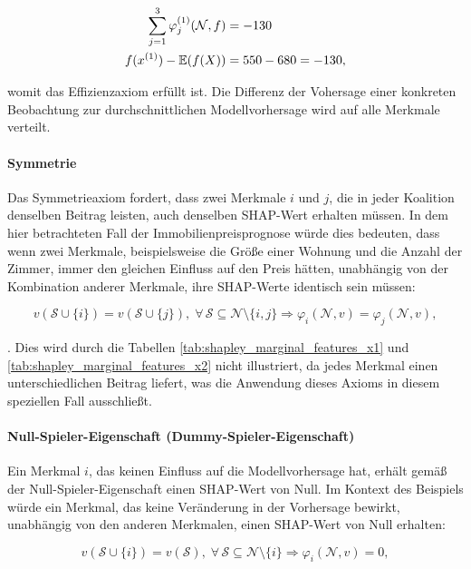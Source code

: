 \begin{align}
    \sum_{j=1}^{3}\varphi_j^{(1)}(\mathcal{N}, f) &=  -130 \\ \notag
    f(x^{(1)}) - \mathbb{E}(f(X)) &= 550 - 680 = -130,   
\end{align}

womit das Effizienzaxiom erfüllt ist. Die Differenz der Vohersage 
einer konkreten Beobachtung zur durchschnittlichen 
Modellvorhersage wird auf alle Merkmale verteilt.

\paragraph{Symmetrie}

Das Symmetrieaxiom fordert, dass zwei Merkmale $i$ und $j$, die 
in jeder Koalition denselben Beitrag leisten, auch denselben SHAP-Wert 
erhalten müssen. In dem hier betrachteten Fall der Immobilienpreisprognose 
würde dies bedeuten, dass wenn zwei Merkmale, beispielsweise die Größe einer 
Wohnung und die Anzahl der Zimmer, immer den gleichen Einfluss auf den Preis hätten, 
unabhängig von der Kombination anderer Merkmale, ihre SHAP-Werte identisch 
sein müssen:

\begin{equation}
    v(\mathcal{S} \cup \{i\}) = v(\mathcal{S} \cup \{j\}), \; \forall\, \mathcal{S} \subseteq \mathcal{N} \setminus \{i, j\} \Rightarrow \varphi_i (\mathcal{N}, v) = \varphi_j (\mathcal{N}, v),
\end{equation}

\cite[S. 221]{Molnar_2022}. Dies wird durch die Tabellen \ref{tab:shapley_marginal_features_x1} und \ref{tab:shapley_marginal_features_x2} 
nicht illustriert, da jedes Merkmal einen unterschiedlichen Beitrag liefert, 
was die Anwendung dieses Axioms in diesem speziellen Fall ausschließt.

\paragraph{Null-Spieler-Eigenschaft (Dummy-Spieler-Eigenschaft)}

Ein Merkmal $i$, das keinen Einfluss auf die Modellvorhersage hat, erhält gemäß der 
Null-Spieler-Eigenschaft einen SHAP-Wert von Null. 
Im Kontext des Beispiels würde ein Merkmal, das keine Veränderung in der Vorhersage 
bewirkt, unabhängig von den anderen Merkmalen, einen SHAP-Wert von Null erhalten:

\begin{equation}
    v(\mathcal{S} \cup \{i\}) =  v(\mathcal{S}), \; \forall\, \mathcal{S} \subseteq \mathcal{N} \setminus \{i\} \Rightarrow \varphi_i (\mathcal{N}, v) = 0,
\end{equation}

